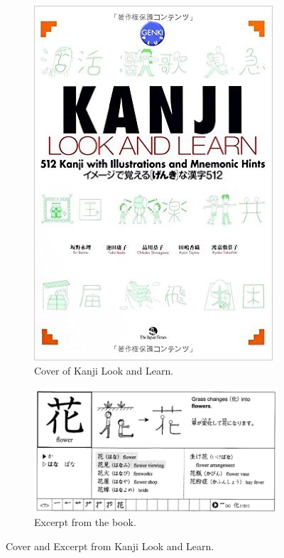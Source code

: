 \begin{figure}[ht]
    \begin{subfigure}{0.5\textwidth}
    \includegraphics[width=0.9\linewidth]{Cap1/LookAndLearnKanji}
    \caption{Cover of Kanji Look and Learn.}
    \label{fig:lookandlearncover}
    \end{subfigure}
    \begin{subfigure}{0.5\textwidth}
    \includegraphics[width=0.9\linewidth]{Cap1/LookAndLearnPage}
    \caption{Excerpt from the book.}
    \label{fig:lookandlearnpage}
    \end{subfigure}
    \caption{Cover and Excerpt from Kanji Look and Learn.}
    \label{fig:lookandlearn}
\end{figure}

